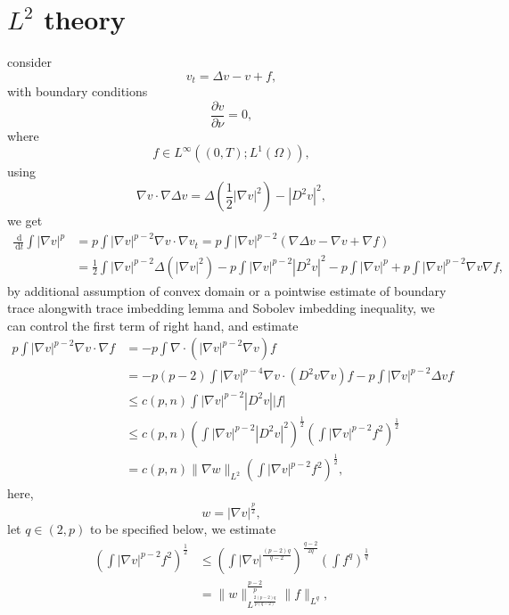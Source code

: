 \documentclass[en,hazy,screen,blue,14pt]{elegantnote}
\numberwithin{dummy}{section}
\newcommand{\dd}{\;\mathrm{d}}
\begin{document}
%



%




\section{\texorpdfstring{$L^2$}{L2} theory}
\label{sec: L2 theory}

consider \cite{Winkler2023}
\begin{equation}
	v_t = \Delta v - v + f,
\end{equation}
with boundary conditions
\begin{equation*}
	\frac{\partial v}{\partial\nu} = 0,
\end{equation*}
where 
\begin{equation*}
	f\in L^\infty((0,T); L^1(\Omega)),
\end{equation*}
using \[
\nabla v \cdot \nabla \Delta v=\Delta\left(\frac{1}{2}|\nabla v|^2\right)-\left|D^2 v\right|^2,
\]
we get
\begin{align*}
	\frac{\dd}{\dd t}\int|\nabla v|^p 
	&= p\int |\nabla v|^{p-2}\nabla v\cdot \nabla v_t 
	= p\int |\nabla v|^{p-2} (\nabla \Delta v - \nabla v + \nabla f) \\
	&= \frac12\int |\nabla v|^{p-2}\Delta (|\nabla v|^2) - p\int |\nabla v|^{p-2}|D^2v|^2 
		-p\int |\nabla v|^p + p\int |\nabla v|^{p-2}\nabla v \nabla f,
\end{align*}
by additional assumption of convex domain 
or a pointwise estimate of boundary trace alongwith trace imbedding lemma and Sobolev imbedding inequality,
we can control the first term of right hand, and estimate
\begin{align*}
	p\int |\nabla v|^{p-2}\nabla v \cdot \nabla f 
	&= - p\int \nabla\cdot(|\nabla v|^{p-2}\nabla v) f\\
	&= -p(p-2)\int |\nabla v|^{p-4}\nabla v\cdot (D^2v\nabla v) f 
		- p \int |\nabla v|^{p-2}\Delta v f\\
	&\leq c(p,n)\int |\nabla v|^{p-2} |D^2v| |f|\\
	&\leq c(p,n)\left(\int |\nabla v|^{p-2}|D^2v|^2\right)^{\frac12}
	\left(\int |\nabla v|^{p-2}f^2\right)^{\frac12}\\
	&= c(p,n) \|\nabla w\|_{L^2} \left(\int |\nabla v|^{p-2}f^2\right)^{\frac12},
\end{align*}
here, 
\[
	w = |\nabla v|^{\frac{p}{2}},	
\]
let $q\in(2,p)$ to be specified below, we estimate
\begin{align*}
	\left(\int |\nabla v|^{p-2}f^2\right)^{\frac12}
	&\leq \left(\int |\nabla v|^{\frac{(p-2)q}{q-2}}\right)^{\frac{q-2}{2q}}
	\left(\int f^q\right)^{\frac{1}{q}}\\
	&= \|w\|_{L^{\frac{2(p-2)q}{p(q-2)}}}^{\frac{p-2}{p}}
		\|f\|_{L^q},
\end{align*}
\end{document}
